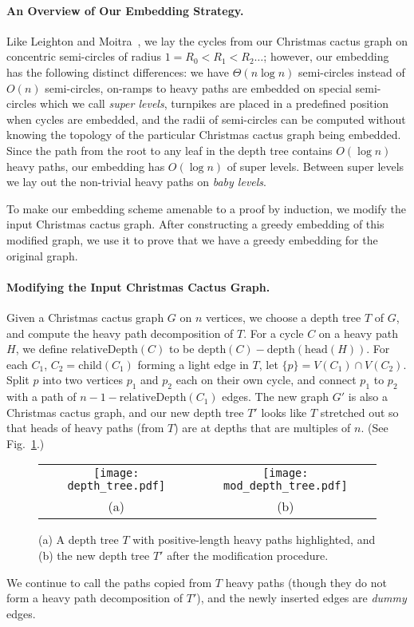 \documentclass[11pt]{article}
\newcommand{\child}{\mathrm{child}}
\newcommand{\depth}{\mathrm{depth}}
\newcommand{\head}{\mathrm{head}}
\newcommand{\relativeDepth}{\mathrm{relativeDepth}}
\newcommand{\leaveout}[1]{#1}  \newcommand{\Leaveout}[2]{#1}  \else
\newcommand{\leaveout}[1]{ }
\newcommand{\Leaveout}[2]{#2}
\renewcommand{\subsection}[1]{\paragraph{#1.}}
\begin{document}
\subsection{An Overview of Our Embedding Strategy}
Like Leighton and Moitra~\cite{lm-srgem-08}, we lay the cycles 
from our Christmas cactus graph on concentric semi-circles of radius 
$1=R_0 < R_1 < R_2 \ldots$; however, our embedding has the 
following distinct differences: we have $\Theta(n\log n)$ semi-circles
instead of $O(n)$ semi-circles, on-ramps to heavy paths are embedded on special 
semi-circles which we call \emph{super levels},
turnpikes are placed in a predefined position when cycles are embedded, 
and the radii of semi-circles can be computed without knowing the topology 
of the particular Christmas cactus graph being embedded. 
\ifFull
Since the path from the root to any leaf in the depth tree 
contains $O(\log{n})$ heavy paths, our embedding has $O(\log{n})$ 
of super levels. Between super levels we lay out the non-trivial 
heavy paths on \emph{baby levels}. \fi

To make our embedding scheme amenable to a proof by induction, we
modify the input Christmas cactus graph. After constructing a greedy embedding of 
this modified graph, we use it to prove that we have a greedy 
embedding for the original graph.

\subsection{Modifying the Input Christmas Cactus Graph}
Given a Christmas cactus graph $G$ on $n$ vertices, we choose a depth 
tree $T$ of $G$, and compute the heavy path decomposition of $T$. 
For a cycle $C$ on a heavy path $H$, we define $\relativeDepth(C)$ to be 
$\depth(C) - \depth(\head(H))$. For each $C_1$, $C_2 = \child(C_1)$ forming 
a light edge in $T$, let $\{p\} = V(C_1) \cap V(C_2)$. Split $p$ into two 
vertices $p_1$ and $p_2$ each on their own cycle, and connect $p_1$ to $p_2$ 
with a path of $n-1-\relativeDepth(C_1)$ edges. The new graph $G'$ 
is also a Christmas cactus graph, and our new depth tree $T'$ looks 
like $T$ stretched out so that heads of heavy paths (from $T$) are 
at depths that are multiples of $n$. (See Fig.~\ref{fig:heavy}.) 
\leaveout{
\begin{figure}[!t]
\begin{center}
\begin{tabular}[b]{cc}
    \texttt{[image: depth\_tree.pdf]} &
    \texttt{[image: mod\_depth\_tree.pdf]} \\
    (a) & (b)
\end{tabular}
    \caption{(a) A depth tree $T$ with positive-length heavy paths highlighted, and 
             (b) the new depth tree $T'$ after the modification procedure.}
    \label{fig:heavy}
\end{center}
\end{figure}
}
We continue to call the paths copied from $T$ heavy paths (though they do 
not form a heavy path decomposition of $T'$), and the newly inserted edges 
are \emph{dummy} edges.
\end{document}
